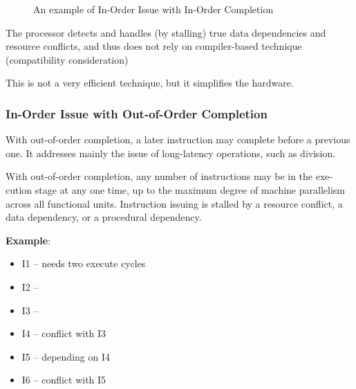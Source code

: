 \begin{figure}[H]
  \centering
  \caption{An example of In-Order Issue with In-Order Completion}
  \label{fig:IOI-IOC}
\end{figure}

The processor detects and handles (by stalling) true data dependencies and resource conflicts, and thus does not rely on compiler-based technique (compatibility consideration)

This is not a very efficient technique, but it simplifies the hardware.

\subsubsection{In-Order Issue with Out-of-Order Completion}
With out-of-order completion, a later instruction may complete before a previous one. It addresses mainly the issue of long-latency operations, such as division.

With out-of-order completion, any number of instructions may be in the exe- cution stage at any one time, up to the maximum degree of machine parallelism across all functional units. Instruction issuing is stalled by a resource conflict, a data dependency, or a procedural dependency.

\textbf{Example}:

\begin{itemize}
\item I1 – needs two execute cycles
\item I2 –
\item I3 –
\item I4 – conflict with I3
\item I5 – depending on I4
\item I6 – conflict with I5
\end{itemize}

